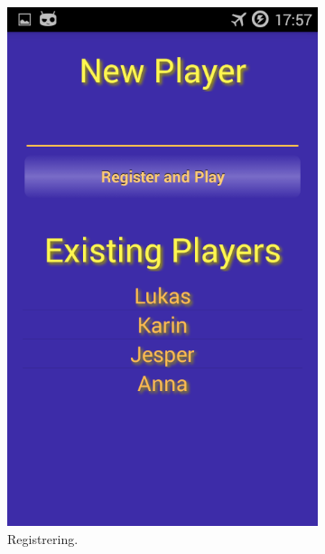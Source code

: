\begin{figure}[ht]
    \centering
    \begin{subfigure}[b]{0.3\textwidth}
        \includegraphics[width=\textwidth]{./img/bruksanvisning/2.png}
        \caption{Registrering.}
        \label{fig:registrering}
    \end{subfigure}
    \begin{subfigure}[b]{0.3\textwidth}

\end{subfigure}
\end{figure}
